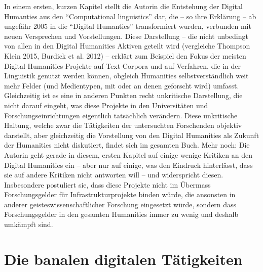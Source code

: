 \documentclass[a4paper,
fontsize=11pt,
oneside,
numbers=noperiodatend,
parskip=half-,
bibliography=totoc,
final
]{scrartcl}
\begin{document}
In einem ersten, kurzen Kapitel stellt die Autorin die Entstehung der
Digital Humanties aus den \enquote{Computational linguistics} dar, die
-- so ihre Erklärung -- ab ungefähr 2005 in die \enquote{Digital
Humanties} transformiert wurden, verbunden mit neuen Versprechen und
Vorstellungen. Diese Darstellung -- die nicht unbedingt von allen in den
Digital Humanities Aktiven geteilt wird (vergleiche Thompson Klein 2015,
Burdick et al. 2012) -- erklärt zum Beispiel den Fokus der meisten
Digital Humanities-Projekte auf Text Corpora und auf Verfahren, die in
der Linguistik genutzt werden können, obgleich Humanities
selbstverständlich weit mehr Felder (und Medientypen, mit oder an denen
geforscht wird) umfasst. Gleichzeitig ist es eine in anderen Punkten
recht unkritische Darstellung, die nicht darauf eingeht, was diese
Projekte in den Universitäten und Forschungseinrichtungen eigentlich
tatsächlich verändern. Diese unkritische Haltung, welche zwar die
Tätigkeiten der untersuchten Forschenden objektiv darstellt, aber
gleichzeitig die Vorstellung von den Digital Humanities als Zukunft der
Humanities nicht diskutiert, findet sich im gesamten Buch. Mehr noch:
Die Autorin geht gerade in diesem, ersten Kapitel auf einige wenige
Kritiken an den Digital Humanities ein -- aber nur auf einige, was den
Eindruck hinterlässt, dass sie auf andere Kritiken nicht antworten will
-- und widerspricht diesen. Insbesondere postuliert sie, dass diese
Projekte nicht im Übermass Forschungsgelder für Infrastrukturprojekte
binden würde, die ansonsten in anderer geisteswissenschaftlicher
Forschung eingesetzt würde, sondern dass Forschungsgelder in den
gesamten Humanities immer zu wenig und deshalb umkämpft sind.

\section*{Die banalen digitalen
Tätigkeiten}\label{die-banalen-digitalen-tuxe4tigkeiten}
\end{document}
